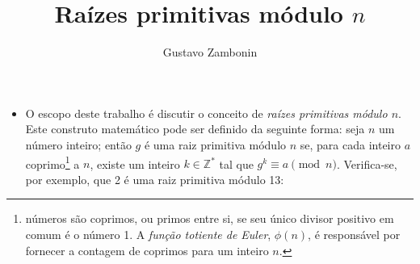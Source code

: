 \documentclass{../sftex/sftex}
\title{Raízes primitivas módulo $n$}
\author{Gustavo Zambonin}
\begin{document}
\maketitle

\begin{itemize}

\item O escopo deste trabalho é discutir o conceito de \emph{raízes primitivas
módulo $n$}. Este construto matemático pode ser definido da seguinte forma: seja
$n$ um número inteiro; então $g$ é uma raiz primitiva módulo $n$ se, para cada
inteiro $a$ coprimo\footnote{números são coprimos, ou primos entre si, se seu
único divisor positivo em comum é o número 1. A \emph{função totiente de Euler},
$\phi(n)$, é responsável por fornecer a contagem de coprimos para um inteiro
$n$.} a $n$, existe um inteiro $k \in \mathbb{Z}^*$ tal que $g^k \equiv a \pmod
n$. Verifica-se, por exemplo, que 2 é uma raiz primitiva módulo 13:


\end{itemize}
\end{document}
